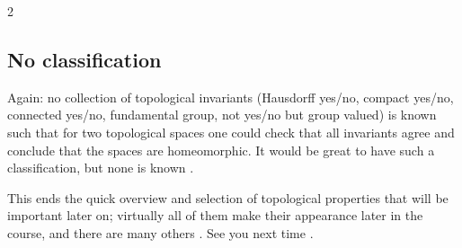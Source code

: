 \begin{paracol}{2}
\subsection{No classification}\label{sec:iv-end}

Again: no collection of topological invariants (Hausdorff yes/no, compact yes/no, connected yes/no, fundamental group, not yes/no but group valued) is known such that for two topological spaces one could check that all invariants agree
and conclude that the spaces are homeomorphic. It would be great to have such a classification, but none is known .

This ends the quick overview and selection of topological properties that will be important later on; virtually all of them make their appearance later in the course, and there are many others
. See you next time .


\end{paracol}
